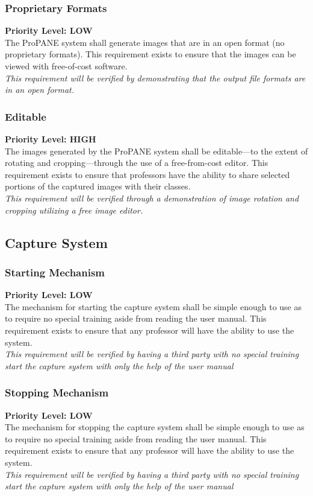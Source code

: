 \documentclass[]{article}
\begin{document}
			\subsubsection{Proprietary Formats}
				\textbf{Priority Level: LOW}\\
				The ProPANE system shall generate images that are in an open format (no proprietary formats). This requirement exists to ensure that the images can be viewed with free-of-cost software. \\
				\emph{This requirement will be verified by demonstrating that the output file formats are in an open format.}
				
			
			\subsubsection{Editable}
				\textbf{Priority Level: HIGH}\\
				The images generated by the ProPANE system shall be editable---to the extent of rotating and cropping---through the use of a free-from-cost editor. This requirement exists to ensure that professors have the ability to share selected portions of the captured images with their classes.\\
				\emph{This requirement will be verified through a demonstration of image rotation and cropping utilizing a free image editor.}
				
				
		\subsection{Capture System}
			
			\subsubsection{Starting Mechanism}
				\textbf{Priority Level: LOW}\\
				The mechanism for starting the capture system shall be simple enough to use as to require no special training aside from reading the user manual. This requirement exists to ensure that any professor will have the ability to use the system.\\
				\emph{This requirement will be verified by having a third party with no special training start the capture system with only the help of the user manual}
				
			
			\subsubsection{Stopping Mechanism}
				\textbf{Priority Level: LOW}\\
				The mechanism for stopping the capture system shall be simple enough to use as to require no special training aside from reading the user manual. This requirement exists to ensure that any professor will have the ability to use the system.\\
				\emph{This requirement will be verified by having a third party with no special training start the capture system with only the help of the user manual}
				
\end{document}
